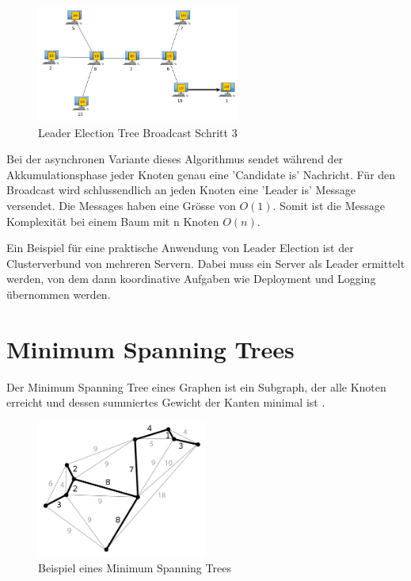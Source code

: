 \begin{enumerate}
\begin{figure}[H]
	\centering
		\includegraphics[width=0.6\textwidth]{bilder/leaderElectionTree_7.png}
	\caption{\label{fig:treeLeader_7}Leader Election Tree Broadcast Schritt 3}
\end{figure}

\end{enumerate}

Bei der asynchronen Variante dieses Algorithmus sendet während der Akkumulationsphase jeder Knoten genau eine 'Candidate is'  Nachricht. Für den Broadcast wird schlussendlich an jeden Knoten eine 'Leader is' Message versendet. Die Messages haben eine Grösse von $O(1)$. Somit ist die Message Komplexität bei einem Baum mit n Knoten $O(n)$.


Ein Beispiel für eine praktische Anwendung von Leader Election ist der Clusterverbund von mehreren Servern. Dabei muss ein Server als Leader ermittelt werden, von dem dann koordinative Aufgaben wie Deployment und Logging übernommen werden.



\section{Minimum Spanning Trees}
Der Minimum Spanning Tree eines Graphen ist ein Subgraph, der alle Knoten erreicht und dessen summiertes Gewicht der Kanten minimal ist \cite{wiki:mst}.

\begin{figure}[H]
	\centering
		\includegraphics[width=0.5\textwidth]{bilder/500px-Minimum_spanning_tree.png}
	\caption{\label{fig:mst}Beispiel eines Minimum Spanning Trees \cite{wiki:mst}}
\end{figure}

